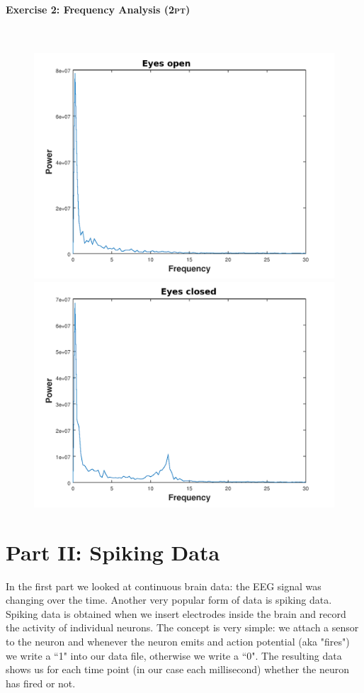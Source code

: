\documentclass[a4paper,11pt]{article}
\newenvironment{exercise}[3]{\paragraph{Exercise #1: #2 \textsc{(#3pt)}}\ \\}{
\medskip}
\begin{document}
\begin{exercise}{2}{Frequency Analysis}{2}
\begin{figure}[H]
   \includegraphics[scale=0.4]{eyes_open.png} 
   \includegraphics[scale=0.4]{eyes_closed.png} 
\end{figure}
\end{exercise}

\section{Part II: Spiking Data}
In the first part we looked at continuous brain data: the EEG signal was changing over the time. Another very popular form of data is spiking data. Spiking data is obtained when we insert electrodes inside the brain and record the activity of individual neurons. The concept is very simple: we attach a sensor to the neuron and whenever the neuron emits and action potential (aka "fires") we write a ``1" into our data file, otherwise we write a ``0". The resulting data shows us for each time point (in our case each millisecond) whether the neuron has fired or not.
\end{document}
